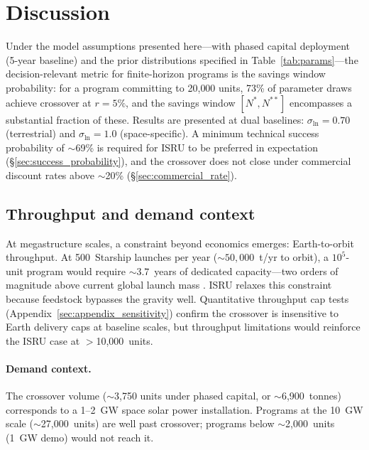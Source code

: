 \documentclass[preprint,12pt]{elsarticle}
\begin{document}
\section{Discussion}
\label{sec:discussion}

Under the model assumptions presented here---with phased capital deployment (5-year baseline) and the prior distributions specified in Table~\ref{tab:params}---the decision-relevant metric for finite-horizon programs is the savings window probability: for a program committing to 20{,}000 units, 73\% of parameter draws achieve crossover at $r = 5\%$, and the savings window $[N^*, N^{**}]$ encompasses a substantial fraction of these. Results are presented at dual baselines: $\sigma_{\ln} = 0.70$ (terrestrial) and $\sigma_{\ln} = 1.0$ (space-specific). A minimum technical success probability of $\sim$69\% is required for ISRU to be preferred in expectation (\S\ref{sec:success_probability}), and the crossover does not close under commercial discount rates above $\sim$20\% (\S\ref{sec:commercial_rate}).

\subsection{Throughput and demand context}
\label{sec:throughput}

At megastructure scales, a constraint beyond economics emerges: Earth-to-orbit throughput. At 500~Starship launches per year (${\sim}50{,}000$~t/yr to orbit), a $10^5$-unit program would require ${\sim}3.7$~years of dedicated capacity---two orders of magnitude above current global launch mass \cite{jones2022}. ISRU relaxes this constraint because feedstock bypasses the gravity well. Quantitative throughput cap tests (Appendix~\ref{sec:appendix_sensitivity}) confirm the crossover is insensitive to Earth delivery caps at baseline scales, but throughput limitations would reinforce the ISRU case at $>$10{,}000~units.

\paragraph{Demand context.} The crossover volume ($\sim$3{,}750 units under phased capital, or $\sim$6{,}900~tonnes) corresponds to a 1--2~GW space solar power installation. Programs at the 10~GW scale ($\sim$27,000~units) are well past crossover; programs below $\sim$2,000~units (1~GW demo) would not reach it.
\end{document}
